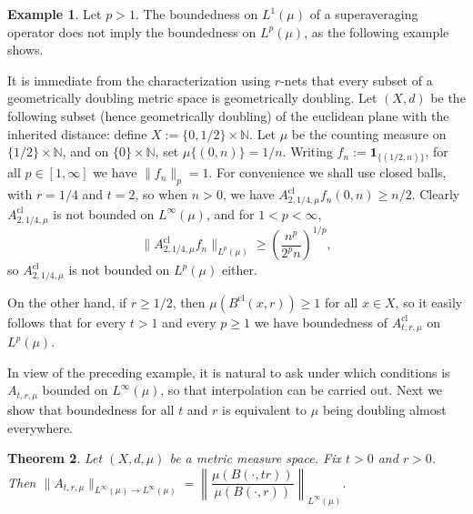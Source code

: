 \documentclass[12pt]{amsart}
\newtheorem{theorem}{Theorem}[section]
\theoremstyle{definition}
\newtheorem{example}[theorem]{Example}
\theoremstyle{parrafo}
\newcommand{\N}{\mathbb{N}}
\begin{document}


	\begin{example}\label{smallballs} Let $ p > 1$. The boundedness on $L^1(\mu)$ of a superaveraging operator does not imply  the boundedness on $L^p(\mu)$, as the following example shows.
		
	 It is immediate from the characterization using $r$-nets that every subset of a geometrically doubling metric space is geometrically doubling. Let $(X, d)$ be the following subset (hence geometrically doubling) of the euclidean plane with the inherited distance: define $X := \{0, 1/2\}\times \N$. Let $\mu$ be the counting measure on $\{1/2\}\times \N$,  and on $\{0\}\times \N$, set $\mu \{(0,n)\}  = 1/n$. 
	 Writing $f_n := \mathbf{1}_{\{(1/2,n)\}}$,
 for all $p\in [1, \infty]$ we have $\|f_n\|_{p} = 1$.
	 For convenience we shall use closed balls, with
	 $r = 1/4$ and $t= 2$, so when $n>0$, we have
 $A_{2, 1/4 , \mu}^{\operatorname{cl}} f_n (0,n) \ge n/2$. Clearly $A_{2, 1/4 , \mu}^{\operatorname{cl}}$ is not bounded on $L^\infty(\mu)$, and for $1 < p < \infty$, 
 $$
 \|A_{2, 1/4 , \mu}^{\operatorname{cl}} f_n\|_{L^p(\mu)} 
 \ge
 \left(\frac{n^p}{2^p n}\right)^{1/p}, 
 $$
 so $A_{2, 1/4 , \mu}^{\operatorname{cl}}$ is not bounded on $L^p(\mu)$ either.
 
 On the other hand, if $r \ge 1/2$, then $\mu (B^{\operatorname{cl}} (x,r)) \ge 1$ for all $x \in X$, so it easily follows that for every $t > 1$ and every $p \ge 1$ we have boundedness of $A_{t, r , \mu}^{\operatorname{cl}}$ on $L^p(\mu)$.
\end{example}

In view of the preceding example, it is natural to ask under which conditions is $A_{t, r , \mu}$
bounded on $L^\infty (\mu)$, so that interpolation can be carried out. Next we show that boundedness for all $t$ and $r$ is equivalent to $\mu$ being doubling almost everywhere.


			\begin{theorem}\label{prop2} Let $(X, d,\mu)$ be a  metric measure space. 
	Fix $t > 0$ and $r > 0$. Then $\|A_{t, r, \mu}\|_{L^{\infty}(\mu)  \to L^\infty (\mu)} = \left\| \dfrac{\mu (B(\cdot,tr))}{\mu (B(\cdot,r))} \right\|_{L^\infty (\mu)}$. 
\end{theorem}
\end{document}
